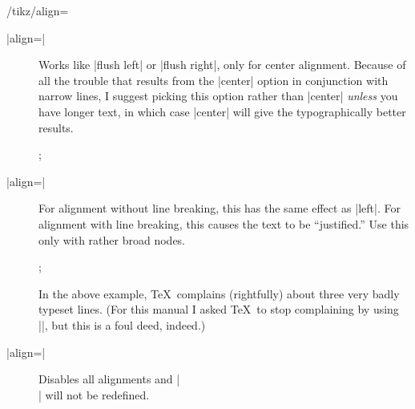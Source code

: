 \begin{key}{/tikz/align=}
\begin{description}
  \item[|align=|]
    Works like |flush left| or |flush right|, only for center
    alignment. Because of all the trouble that results from the
    |center| option in conjunction with narrow lines, I suggest picking
    this option rather than  |center| \emph{unless} you have longer
    text, in which case |center| will give the typographically better
    results. 
\begin{codeexample}[]
\tikz {};
\end{codeexample}

  \item[|align=|]
    For alignment without line breaking, this has the same effect as
    |left|. For alignment with line breaking, this causes the text to
    be ``justified.'' Use this only with rather broad nodes.
{%
\begin{codeexample}[]
\tikz {};
\end{codeexample}
}
  In the above example, \TeX\ complains (rightfully) about three very
  badly typeset lines. (For this manual I asked \TeX\ to stop
  complaining by using ||, but this is a foul deed,
  indeed.)

  \item[|align=|]
    Disables all alignments and |\\| will not be redefined.
  \end{description}
\end{key}


